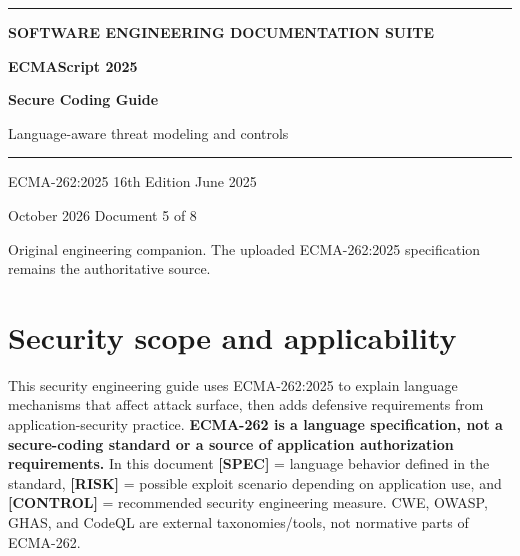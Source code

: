 \documentclass[11pt,letterpaper]{article}
\begin{document}
\hypersetup{pageanchor=false}%
\begin{titlepage}
\thispagestyle{empty}
\vspace*{2.8cm}
{\color{Gold}\rule{18mm}{3pt}}\par\vspace{18mm}
{\sffamily\Large\bfseries\color{Teal} SOFTWARE ENGINEERING DOCUMENTATION SUITE}\par
\vspace{8mm}
{\sffamily\huge\bfseries\color{DeepNavy} ECMAScript 2025 }\par
\vspace{4mm}
{\sffamily\fontsize{24}{29}\selectfont\bfseries\color{DeepNavy} Secure Coding Guide }\par
\vspace{10mm}
{\large\color{Slate} Language-aware threat modeling and controls }\par
\vspace{16mm}
{\color{Teal}\rule{\textwidth}{0.8pt}}\par
\vfill
{\sffamily\color{Slate}\large ECMA-262:2025 \textbullet{} 16th Edition \textbullet{} June 2025}\par
\vspace{3mm}
{\sffamily\color{Slate} October 2026 \textbullet{} Document 5 of 8}\par
\vspace{3mm}
{\small\color{Slate} Original engineering companion. The uploaded ECMA-262:2025 specification remains the authoritative source.}\par
\end{titlepage}\hypersetup{pageanchor=true}
\tableofcontents
\clearpage
\section{Security scope and applicability}\label{security-scope-and-applicability}

This security engineering guide uses ECMA-262:2025 to explain language mechanisms that affect attack surface, then adds defensive requirements from application-security practice. \textbf{ECMA-262 is a language specification, not a secure-coding standard or a source of application authorization requirements.} In this document \textbf{{[}SPEC{]}} = language behavior defined in the standard, \textbf{{[}RISK{]}} = possible exploit scenario depending on application use, and \textbf{{[}CONTROL{]}} = recommended security engineering measure. CWE, OWASP, GHAS, and CodeQL are external taxonomies/tools, not normative parts of ECMA-262.
\end{document}
